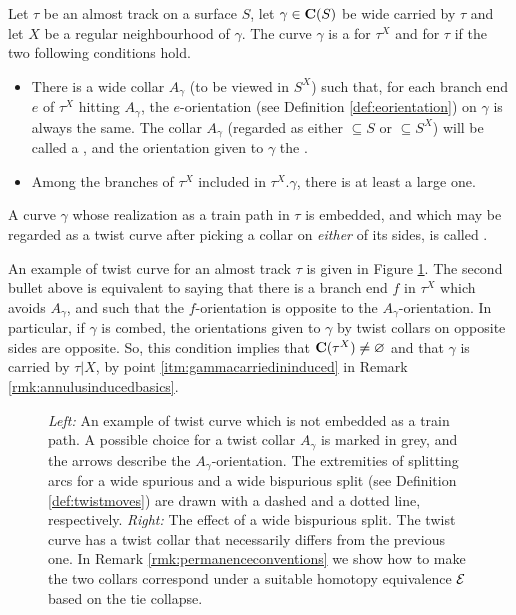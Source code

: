 \begin{defin}\label{def:twistcurve}
Let $\tau$ be an almost track on a surface $S$, let $\gamma\in\mathbf C(S)$ be wide carried by $\tau$ and let $X$ be a regular neighbourhood of $\gamma$. The curve $\gamma$ is a  for $\tau^X$ and for $\tau$ if the two following conditions hold.
\begin{itemize}
\item There is a wide collar $A_\gamma$ (to be viewed in $S^X$) such that, for each branch end $e$ of $\tau^X$ hitting $A_\gamma$, the $e$-orientation (see Definition \ref{def:eorientation}) on $\gamma$ is always the same. The collar $A_\gamma$ (regarded as either $\subseteq S$ or $\subseteq S^X$) will be called a , and the orientation given to $\gamma$ the .
\item Among the branches of $\tau^X$ included in $\tau^X.\gamma$, there is at least a large one.
\end{itemize}
A curve $\gamma$ whose realization as a train path in $\tau$ is embedded, and which may be regarded as a twist curve after picking a collar on \emph{either} of its sides, is called .
\end{defin}

An example of twist curve for an almost track $\tau$ is given in Figure \ref{fig:twistcurve}. The second bullet above is equivalent to saying that there is a branch end $f$ in $\tau^X$ which avoids $A_\gamma$, and such that the $f$-orientation is opposite to the $A_\gamma$-orientation. In particular, if $\gamma$ is combed, the orientations given to $\gamma$ by twist collars on opposite sides are opposite. So, this condition implies that $\mathbf C(\tau^X)\not=\varnothing$ and that $\gamma$ is carried by $\tau|X$, by point \ref{itm:gammacarriedininduced} in Remark \ref{rmk:annulusinducedbasics}.

\begin{figure}
\caption{\label{fig:twistcurve}\emph{Left:} An example of twist curve which is not embedded as a train path. A possible choice for a twist collar $A_\gamma$ is marked in grey, and the arrows describe the $A_\gamma$-orientation. The extremities of splitting arcs for a wide spurious and a wide bispurious split (see Definition \ref{def:twistmoves}) are drawn with a dashed and a dotted line, respectively. \emph{Right:} The effect of a wide bispurious split. The twist curve has a twist collar that necessarily differs from the previous one. In Remark \ref{rmk:permanenceconventions} we show how to make the two collars correspond under a suitable homotopy equivalence $\mathcal{E}$ based on the tie collapse.}
\end{figure}

